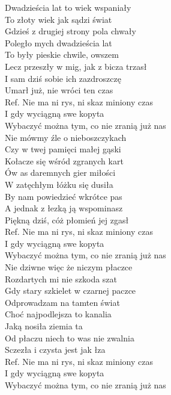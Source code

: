 
Dwadzieścia lat to wiek wspaniały \\
To złoty wiek jak sądzi świat \tab{}\\
Gdzieś z drugiej strony pola chwały \\
Poległo mych dwadzieścia lat \tab{}\\
To były pieskie chwile, owszem \\
Lecz przeszły w mig, jak z bicza trzasł \\
I sam dziś sobie ich zazdroszczę \\
Umarł już, nie wróci ten czas \tab{}\\
\hops
Ref. Nie ma ni rys, ni skaz miniony czas \tab{}\\
 I gdy wyciągną swe kopyta \tab{}\\
 Wybaczyć można tym, co nie zranią już nas \\
\hops
Nie mówmy źle o nieboszczykach \\
Czy w twej pamięci małej gąski \\
Kołacze się wśród zgranych kart \\
Ów as daremnych gier miłości \\
W zatęchłym łóżku się dusiła \\
By nam powiedzieć wkrótce pas \\
A jednak z łezką ją wspominasz \\
Piękną dziś, cóż płomień jej zgasł \\
\hops
Ref. Nie ma ni rys, ni skaz miniony czas\\
 I gdy wyciągną swe kopyta \\
 Wybaczyć można tym, co nie zranią już nas\\
\hops
Nie dziwne więc że niczym płaczce \\
Rozdartych mi nie szkoda szat \\
Gdy stary szkielet w czarnej paczce \\
Odprowadzam na tamten świat \\
Choć najpodlejsza to kanalia \\
Jaką nosiła ziemia ta \\
Od płaczu niech to was nie zwalnia \\
Sczezła i czysta jest jak łza \\
\hops
Ref. Nie ma ni rys, ni skaz miniony czas\\
 I gdy wyciągną swe kopyta \\
 Wybaczyć można tym, co nie zranią już nas 